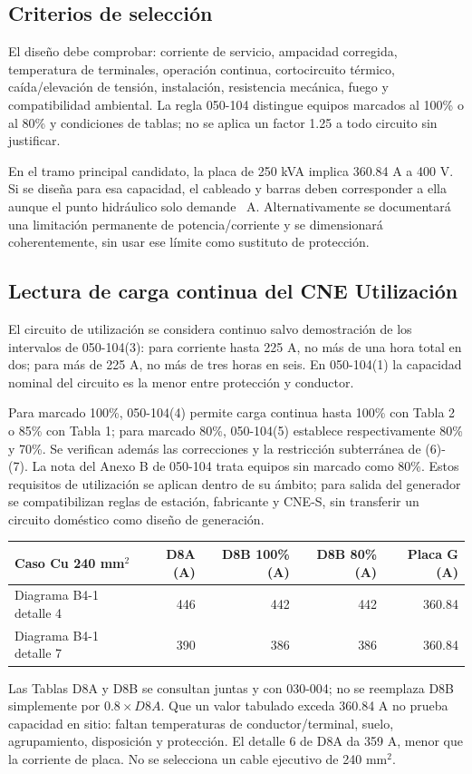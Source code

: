 \subsection{Criterios de selección}
El diseño debe comprobar: corriente de servicio, ampacidad corregida, temperatura de terminales, operación continua, cortocircuito térmico, caída/elevación de tensión, instalación, resistencia mecánica, fuego y compatibilidad ambiental. La regla 050-104 distingue equipos marcados al 100\% o al 80\% y condiciones de tablas; no se aplica un factor 1.25 a todo circuito sin justificar.

En el tramo principal candidato, la placa de 250 kVA implica 360.84 A a 400 V. Si se diseña para esa capacidad, el cableado y barras deben corresponder a ella aunque el punto hidráulico solo demande \IGen\ A. Alternativamente se documentará una limitación permanente de potencia/corriente y se dimensionará coherentemente, sin usar ese límite como sustituto de protección.

\subsection{Lectura de carga continua del CNE Utilización}
El circuito de utilización se considera continuo salvo demostración de los intervalos de 050-104(3): para corriente hasta 225 A, no más de una hora total en dos; para más de 225 A, no más de tres horas en seis. En 050-104(1) la capacidad nominal del circuito es la menor entre protección y conductor.

Para marcado 100\%, 050-104(4) permite carga continua hasta 100\% con Tabla 2 o 85\% con Tabla 1; para marcado 80\%, 050-104(5) establece respectivamente 80\% y 70\%. Se verifican además las correcciones y la restricción subterránea de (6)-(7). La nota del Anexo B de 050-104 trata equipos sin marcado como 80\%. Estos requisitos de utilización se aplican dentro de su ámbito; para salida del generador se compatibilizan reglas de estación, fabricante y CNE-S, sin transferir un circuito doméstico como diseño de generación.

\begin{longtable}{L{4.6cm}rrrr}
\toprule Caso Cu 240 mm$^2$ & D8A (A) & D8B 100\% (A) & D8B 80\% (A) & Placa G (A)\\\midrule
Diagrama B4-1 detalle 4 & 446 & 442 & 442 & 360.84\\
Diagrama B4-1 detalle 7 & 390 & 386 & 386 & 360.84\\
\bottomrule
\end{longtable}
Las Tablas D8A y D8B se consultan juntas y con 030-004; no se reemplaza D8B simplemente por $0.8\times D8A$. Que un valor tabulado exceda 360.84 A no prueba capacidad en sitio: faltan temperaturas de conductor/terminal, suelo, agrupamiento, disposición y protección. El detalle 6 de D8A da 359 A, menor que la corriente de placa. No se selecciona un cable ejecutivo de 240 mm$^2$.

